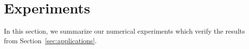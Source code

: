 \section{Experiments}\label{sec:experiments}
In this section, we summarize our numerical experiments which verify the results from Section~\ref{sec:applications}.


